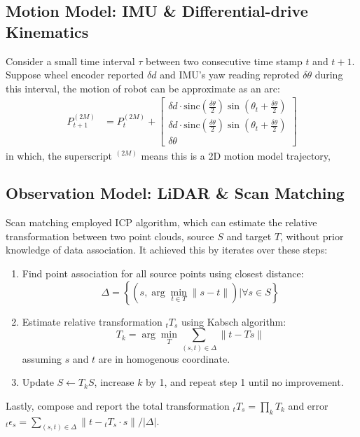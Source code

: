 \documentclass[conference]{IEEEtran}
\begin{document}
\subsection{Motion Model: IMU \& Differential-drive Kinematics}
Consider a small time interval $\tau$ between two consecutive time stamp $t$ and $t+1$.
Suppose wheel encoder reported $\delta d$
and IMU's yaw reading reproted $\delta \theta$ during this interval,
the motion of robot can be approximate as an arc:
$$
\begin{aligned}
    P_{t+1}^{(2M)}
    &=P_{t}^{(2M)} +\left[ \begin{gathered}\delta d\cdot \mathrm{sinc} \left( \frac{\delta \theta }{2} \right)  \sin \left( \theta_{t} +\frac{\delta \theta }{2} \right)  \\ \delta d\cdot \mathrm{sinc} \left( \frac{\delta \theta }{2} \right)  \sin \left( \theta_{t} +\frac{\delta \theta }{2} \right)  \\ \delta \theta \end{gathered} \right]
\end{aligned} 
$$
in which, the superscript $^{(2M)}$ means this is a 2D motion model trajectory,


\subsection{Observation Model: LiDAR \& Scan Matching}
Scan matching employed ICP algorithm,
which can estimate the relative transformation between 
two point clouds, source $S$ and target $T$,
without prior knowledge of data association.
It achieved this by iterates over these steps:
\begin{enumerate}
    \item Find point association for all source points using closest distance:
    $$ \Delta = \left\{\left(s, \arg\min_{t\in T} \|s - t\| \right) \bigg| \forall s\in S\right\}$$

    \item Estimate relative transformation $_tT_s$ using Kabsch algorithm:
    $$T_k = \arg\min_T \sum\limits_{(s,t)\in\Delta} \|t - Ts\|$$
    assuming $s$ and $t$ are in homogenous coordinate.
    \item Update $S \leftarrow T_k S$, increase $k$ by 1, and repeat step 1 until no improvement.
\end{enumerate}
Lastly, compose and report the total transformation $_tT_s = \prod_k T_k$ and error 
$_t\epsilon_s = \sum_{(s,t)\in\Delta} \|t - {}_tT_s\cdot s\| / |\Delta| $.
\end{document}
